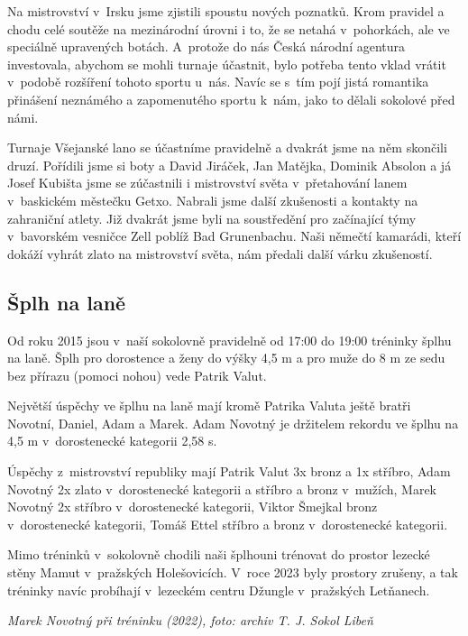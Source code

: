 \documentclass[a5paper, 12pt, twoside]{article}
\begin{document}
Na mistrovství v~Irsku jsme zjistili spoustu nových poznatků. Krom
pravidel a chodu celé soutěže na mezinárodní úrovni i to, že se netahá
v~pohorkách, ale ve speciálně upravených botách. A~protože do nás Česká
národní agentura investovala, abychom se mohli turnaje účastnit, bylo
potřeba tento vklad vrátit v~podobě rozšíření tohoto sportu u~nás. Navíc
se s~tím pojí jistá romantika přinášení neznámého a zapomenutého sportu
k~nám, jako to dělali sokolové před námi.

Turnaje Všejanské lano se účastníme pravidelně a dvakrát jsme na něm
skončili druzí. Pořídili jsme si boty a David Jiráček, Jan Matějka,
Dominik Absolon a já Josef Kubišta jsme se zúčastnili i mistrovství
světa v~přetahování lanem v~baskickém městečku Getxo. Nabrali jsme další
zkušenosti a kontakty na zahraniční atlety. Již dvakrát jsme byli na
soustředění pro začínající týmy v~bavorském vesničce Zell poblíž Bad
Grunenbachu. Naši němečtí kamarádi, kteří dokáží vyhrát zlato na
mistrovství světa, nám předali další várku zkušeností.

\subsection{Šplh na laně}

Od roku 2015 jsou v~naší sokolovně pravidelně od 17:00 do 19:00 tréninky
šplhu na laně. Šplh pro dorostence a ženy do výšky 4,5 m a pro muže do 8
m ze sedu bez přírazu (pomoci nohou) vede Patrik Valut.

Největší úspěchy ve šplhu na laně mají kromě Patrika Valuta ještě bratři
Novotní, Daniel, Adam a Marek. Adam Novotný je držitelem rekordu ve
šplhu na 4,5 m v~dorostenecké kategorii 2,58 s.

Úspěchy z~mistrovství republiky mají Patrik Valut 3x bronz a 1x stříbro,
Adam Novotný 2x zlato v~dorostenecké kategorii a stříbro a bronz
v~mužích, Marek Novotný 2x stříbro v~dorostenecké kategorii, Viktor
Šmejkal bronz v~dorostenecké kategorii, Tomáš Ettel stříbro a bronz
v~dorostenecké kategorii.

Mimo tréninků v~sokolovně chodili naši šplhouni trénovat do prostor
lezecké stěny Mamut v~pražských Holešovicích. V~roce 2023 byly prostory
zrušeny, a tak tréninky navíc probíhají v~lezeckém centru Džungle
v~pražských Letňanech.


\textit{Marek Novotný při tréninku (2022), foto: archiv T. J. Sokol Libeň}
\end{document}
